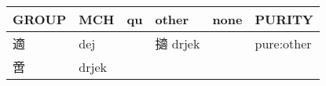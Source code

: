 \documentclass[14pt,a4paper]{scrartcl}
\begin{document}
\begin{longtable}[c]{@{}llllll@{}}
\toprule
\begin{minipage}[b]{0.14\columnwidth}\raggedright\strut
GROUP
\strut\end{minipage} &
\begin{minipage}[b]{0.14\columnwidth}\raggedright\strut
MCH
\strut\end{minipage} &
\begin{minipage}[b]{0.14\columnwidth}\raggedright\strut
qu
\strut\end{minipage} &
\begin{minipage}[b]{0.14\columnwidth}\raggedright\strut
other
\strut\end{minipage} &
\begin{minipage}[b]{0.14\columnwidth}\raggedright\strut
none
\strut\end{minipage} &
\begin{minipage}[b]{0.14\columnwidth}\raggedright\strut
PURITY
\strut\end{minipage}\tabularnewline
\midrule
\endhead
\begin{minipage}[t]{0.14\columnwidth}\raggedright\strut
適
\strut\end{minipage} &
\begin{minipage}[t]{0.14\columnwidth}\raggedright\strut
dej
\strut\end{minipage} &
\begin{minipage}[t]{0.14\columnwidth}\raggedright\strut
\strut\end{minipage} &
\begin{minipage}[t]{0.14\columnwidth}\raggedright\strut
擿 drjek
\strut\end{minipage} &
\begin{minipage}[t]{0.14\columnwidth}\raggedright\strut
\strut\end{minipage} &
\begin{minipage}[t]{0.14\columnwidth}\raggedright\strut
pure:other
\strut\end{minipage}\tabularnewline
\begin{minipage}[t]{0.14\columnwidth}\raggedright\strut
啻
\strut\end{minipage} &
\begin{minipage}[t]{0.14\columnwidth}\raggedright\strut
drjek
\strut\end{minipage} &
\begin{minipage}[t]{0.14\columnwidth}\raggedright\strut
\strut\end{minipage} &
\begin{minipage}[t]{0.14\columnwidth}\raggedright\strut

\end{minipage}
\end{longtable}
\end{document}
